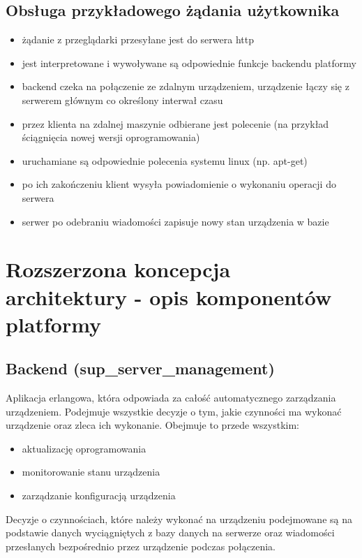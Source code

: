 \documentclass[polish,12pt]{aghthesis}
\begin{document}
\subsection{Obsługa przykładowego żądania użytkownika}
\begin{itemize}
\item żądanie z przeglądarki przesyłane jest do serwera http
\item jest interpretowane i wywoływane są odpowiednie funkcje backendu platformy
\item backend czeka na połączenie ze zdalnym urządzeniem, urządzenie łączy się z serwerem głównym co określony interwał czasu
\item przez klienta na zdalnej maszynie odbierane jest polecenie (na przykład ściągnięcia nowej wersji oprogramowania)
\item uruchamiane są odpowiednie polecenia systemu linux (np. apt-get)
\item po ich zakończeniu klient wysyła powiadomienie o wykonaniu operacji do serwera
\item serwer po odebraniu wiadomości zapisuje nowy stan urządzenia w bazie
\end{itemize}




\section{Rozszerzona koncepcja architektury - opis komponentów platformy}

\subsection{Backend (sup\_server\_management)}
Aplikacja erlangowa, która odpowiada za całość automatycznego zarządzania urządzeniem. Podejmuje wszystkie decyzje o tym, jakie czynności ma wykonać urządzenie oraz zleca ich wykonanie. Obejmuje to przede wszystkim:

\begin{itemize}
\item aktualizację oprogramowania
\item monitorowanie stanu urządzenia
\item zarządzanie konfiguracją urządzenia
\end{itemize}

Decyzje o czynnościach, które należy wykonać na urządzeniu podejmowane są na podstawie danych wyciągniętych z bazy danych na serwerze oraz wiadomości przesłanych bezpośrednio przez urządzenie podczas połączenia.
\end{document}
